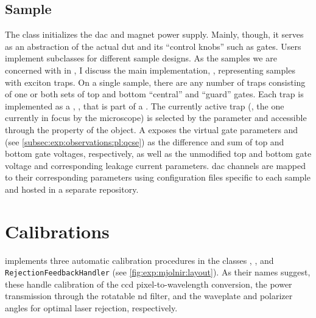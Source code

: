 \subsection{Sample}\label{subsec:exp:mjolnir:logical_instruments:sam}
The  class initializes the \qdac \gls{dac} and magnet power supply.
Mainly, though, it serves as an abstraction of the actual \gls{dut} and its \enquote{control knobs} such as gates.
Users implement subclasses for different sample designs.
As the samples we are concerned with in \thethesis, I discuss the main implementation, , representing samples with exciton traps.
On a single sample, there are any number of traps consisting of one or both sets of top and bottom \enquote{central} and \enquote{guard} gates.
Each trap is implemented as a \qcodes {}, , that is part of a .
The currently active trap (\ie, the one currently in focus by the microscope) is selected by the  parameter and accessible through the  property of the  object.
A  exposes the virtual gate parameters
 and  (see \cref{subsec:exp:observations:pl:qcse}) as the difference and sum of top and bottom gate voltages, respectively, as well as the unmodified top and bottom gate voltage and corresponding leakage current parameters.
\Gls{dac} channels are mapped to their corresponding  parameters using  configuration files specific to each sample and hosted in a separate repository.

\section{Calibrations}\label{sec:exp:mjolnir:calibration}
\mjolnir implements three automatic calibration procedures in the classes , , and \texttt{RejectionFeedbackHandler} (see \cref{fig:exp:mjolnir:layout}).
As their names suggest, these handle calibration of the \gls{ccd} pixel-to-wavelength conversion, the power transmission through the rotatable \gls{nd} filter, and the waveplate and polarizer angles for optimal laser rejection, respectively.


